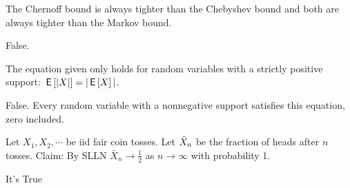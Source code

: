 \documentclass[tf-tutorial-all.tex]{subfiles}
\begin{document}
\begin{truefalse}
The Chernoff bound is always tighter than the Chebyshev bound and both are always tighter than the Markov bound.
\begin{solution}
False.
\end{solution}
\end{truefalse}

\begin{truefalse}
The equation given only holds for random variables with a strictly positive support:
$\,\mathsf{E}\left[|X|\right] = |\,\mathsf{E}\left[X\right]|$.
\begin{solution}
False. Every random variable with a nonnegative support satisfies this equation, zero included.
\end{solution}
\end{truefalse}


\begin{truefalse}
Let $X_1, X_2, \cdots$ be iid fair coin tosses.
Let $\Bar{X}_n$ be the fraction of heads after $n$ tosses.
Claim: By SLLN $\bar X_n \rightarrow \frac{1}{2}$ as $n\to \infty$ with probability 1.
\begin{solution}
It's True
\end{solution}
\end{truefalse}
\end{document}
